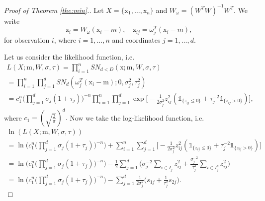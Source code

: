 \documentclass[12pt]{article}
\def\w{\omega}
\def\x{\mathrm{x}}
\def\m{\mathrm{m}}
\def\z{\mathrm{z}}
\def\1{\mathds{1}}
\theoremstyle{definition}
\def\w{\omega}
\begin{document}
\begin{proof}[Proof of Theorem \ref{the:min}.]
Let $X=\{ \x_1, \ldots, \x_n \}$ and $W_{\omega}=(W^TW)^{-1}W^T$.
We write 
$$
\z_i=  W_{\omega}(\x_i-m), \quad \z_{ij}= \omega_j^T(\x_i-m),
$$
for observation $i$, where $i=1,\ldots,n$ and coordinates $j=1,\ldots,d$.


Let us consider the likelihood function, i.e. 
$$
\begin{array}{l}
L(X;\m,W,\sigma,\tau) = \prod\limits_{i=1}^{n} SN_{d<D}(\x;\m,W,\sigma,\tau) \\[6pt] 
=\prod\limits_{i=1}^{n} \prod\limits_{j=1}^{d} SN_d(  \w_j^T (\x_i - \m) ; 0 , \sigma_j^2, \tau_j^2)\\[6pt]
=c_1^{n} \Big( \prod\limits_{j=1}^{d} \sigma_j(1+\tau_j) \Big)^{-n} %
\prod\limits_{i=1}^{n} \prod\limits_{j=1}^{d} \exp \Big[ -\frac{1}{2\sigma_j^2}z_{ij}^2 (\1_{ \{ z_{ij} \leq 0 \} } + \tau_{j}^{-2} \1_{ \{ z_{ij} > 0 \} }) \Big],
\end{array}
$$
where 
$
c_1=\left( \sqrt{\tfrac{2}{\pi}} \right)^{d}.
$
Now we take the log-likelihood function, i.e.
$$
\begin{array}{l}
\ln(L(X;\m,W,\sigma,\tau)) \\[6pt]
=\ln \bigg( c_1^{n} \Big( \prod\limits_{j=1}^{d} \sigma_j(1+\tau_j) \Big)^{-n} \bigg) + %
 \sum\limits_{i=1}^{n} \sum\limits_{j=1}^{d} \Big[ -\frac{1}{2\sigma_j^2}z_{ij}^2 (\1_{ \{ z_{ij} \leq 0 \} } + \tau_{j}^{-2} \1_{ \{ z_{ij} > 0 \} })\Big]  \\[6pt]
= \ln \bigg( c_1^{n} \Big( \prod\limits_{j=1}^{d} \sigma_j(1+\tau_j) \Big)^{-n} \bigg)  -%
  \frac{1}{2} \sum\limits_{j=1}^{d} \Big( \sigma_j^{-2} \sum\limits_{i \in I_{j}}    z_{ij}^2   + \frac{\sigma_j^{-2}}{\tau_{j}^{2} }  \sum\limits_{i \in I_{j}^{c}}   z_{ij}^2  \Big) \\[6pt]
= \ln \bigg(  c_1 ^{n} \Big( \prod\limits_{j=1}^{d} \sigma_j(1+\tau_j) \Big)^{-n} \bigg)  - 
 \sum\limits_{j=1}^{d} \frac{1}{2\sigma_j^{2}} \Big(  s_{1j}  + \frac{1}{\tau_{j}^{2} }  s_{2j}  \Big).
\end{array}
$$


\end{proof}
\end{document}
